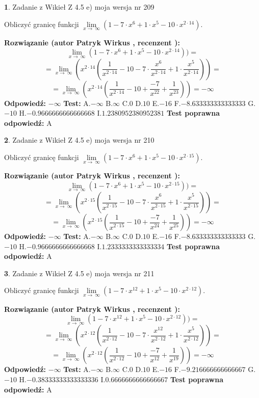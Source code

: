 \documentclass[12pt, a4paper]{article}
\theoremstyle{definition} %
\newtheorem{zad}{}
\newcommand{\zadStart}[1]{\begin{zad}#1\newline}
\newcommand{\zadStop}{\end{zad}}
\newcommand{\rozwStart}[2]{\noindent \textbf{Rozwiązanie (autor #1 , recenzent #2): }\newline}
\newcommand{\rozwStop}{\newline}
\newcommand{\odpStart}{\noindent \textbf{Odpowiedź:}\newline}
\newcommand{\odpStop}{\newline}
\newcommand{\testStart}{\noindent \textbf{Test:}\newline}
\newcommand{\testStop}{\newline}
\newcommand{\kluczStart}{\noindent \textbf{Test poprawna odpowiedź:}\newline}
\newcommand{\kluczStop}{\newline}
\begin{document}
\zadStart{Zadanie z Wikieł Z 4.5 e) moja wersja nr 209}


Obliczyć granicę funkcji  $\lim\limits_{x\to\ \infty}(1 - 7 \cdot x^{6}+1 \cdot x^{5}- 10 \cdot x^{2\cdot14})$.
\zadStop
\rozwStart{Patryk Wirkus}{}
$$\lim\limits_{x\to\ \infty}(1 - 7 \cdot x^{6}+1 \cdot x^{5}- 10 \cdot x^{2\cdot14}))=$$
$$=\lim\limits_{x\to\ \infty}(x^{2\cdot14}(\frac{1}{x^{2\cdot14}}-10 -7 \cdot \frac{x^{6}}{x^{2\cdot14}}+1 \cdot \frac{x^{5}}{x^{2\cdot14}}))=$$
$$=\lim\limits_{x\to\ \infty}(x^{2\cdot14}(\frac{1}{x^{2\cdot14}}-10 + \frac{-7}{x^{22}}+ \frac{1}{x^{23}}))=-\infty$$
\rozwStop
\odpStart
$-\infty$
\odpStop
\testStart
A.$-\infty$ B.$\infty$ C.$0$ D.$10$ E.$-16$
F.$-8.633333333333333$ G.$-10$
H.$-0.9666666666666668$
I.$1.2380952380952381$
\testStop
\kluczStart
A
\kluczStop



\zadStart{Zadanie z Wikieł Z 4.5 e) moja wersja nr 210}


Obliczyć granicę funkcji  $\lim\limits_{x\to\ \infty}(1 - 7 \cdot x^{6}+1 \cdot x^{5}- 10 \cdot x^{2\cdot15})$.
\zadStop
\rozwStart{Patryk Wirkus}{}
$$\lim\limits_{x\to\ \infty}(1 - 7 \cdot x^{6}+1 \cdot x^{5}- 10 \cdot x^{2\cdot15}))=$$
$$=\lim\limits_{x\to\ \infty}(x^{2\cdot15}(\frac{1}{x^{2\cdot15}}-10 -7 \cdot \frac{x^{6}}{x^{2\cdot15}}+1 \cdot \frac{x^{5}}{x^{2\cdot15}}))=$$
$$=\lim\limits_{x\to\ \infty}(x^{2\cdot15}(\frac{1}{x^{2\cdot15}}-10 + \frac{-7}{x^{24}}+ \frac{1}{x^{25}}))=-\infty$$
\rozwStop
\odpStart
$-\infty$
\odpStop
\testStart
A.$-\infty$ B.$\infty$ C.$0$ D.$10$ E.$-16$
F.$-8.633333333333333$ G.$-10$
H.$-0.9666666666666668$
I.$1.2333333333333334$
\testStop
\kluczStart
A
\kluczStop



\zadStart{Zadanie z Wikieł Z 4.5 e) moja wersja nr 211}


Obliczyć granicę funkcji  $\lim\limits_{x\to\ \infty}(1 - 7 \cdot x^{12}+1 \cdot x^{5}- 10 \cdot x^{2\cdot12})$.
\zadStop
\rozwStart{Patryk Wirkus}{}
$$\lim\limits_{x\to\ \infty}(1 - 7 \cdot x^{12}+1 \cdot x^{5}- 10 \cdot x^{2\cdot12}))=$$
$$=\lim\limits_{x\to\ \infty}(x^{2\cdot12}(\frac{1}{x^{2\cdot12}}-10 -7 \cdot \frac{x^{12}}{x^{2\cdot12}}+1 \cdot \frac{x^{5}}{x^{2\cdot12}}))=$$
$$=\lim\limits_{x\to\ \infty}(x^{2\cdot12}(\frac{1}{x^{2\cdot12}}-10 + \frac{-7}{x^{12}}+ \frac{1}{x^{19}}))=-\infty$$
\rozwStop
\odpStart
$-\infty$
\odpStop
\testStart
A.$-\infty$ B.$\infty$ C.$0$ D.$10$ E.$-16$
F.$-9.216666666666667$ G.$-10$
H.$-0.38333333333333336$
I.$0.6666666666666667$
\testStop
\kluczStart
A
\kluczStop
\end{document}
